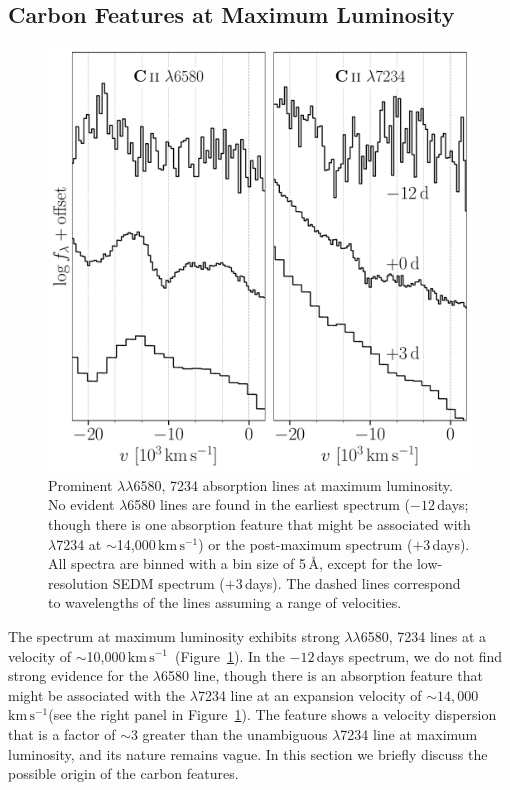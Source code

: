 \documentclass[twocolumn]{aastex631}
\newcommand{\kms}{$\mathrm{km}\,\mathrm{s}^{-1}$}
\begin{document}
\begin{CJK*}{UTF8}{gbsn}
\subsection{Carbon Features at Maximum Luminosity}\label{sec:disc_C_II}
\begin{figure}
    \centering
    \includegraphics[width=\linewidth]{C_II.pdf}
    \caption{Prominent  $\lambda\lambda$6580, 7234 absorption lines at maximum luminosity. No evident  $\lambda$6580 lines are found in the earliest spectrum ($-12$\,days; though there is one absorption feature that might be associated with  $\lambda$7234 at $\sim$14,000\,\kms) or the post-maximum spectrum ($+3$\,days). All spectra are binned with a bin size of 5\,\AA, except for the low-resolution SEDM spectrum ($+3$\,days). The dashed lines correspond to wavelengths of the  lines assuming a range of velocities.}
    \label{fig:C_II}
\end{figure}
The spectrum at maximum luminosity exhibits strong  $\lambda\lambda$6580, 7234 lines at a velocity of $\sim$10,000\,\kms\  (Figure~\ref{fig:C_II}). In the $-12$\,days spectrum, we do not find strong evidence for the  $\lambda$6580 line, though there is an absorption feature that might be associated with the  $\lambda$7234 line at an expansion velocity of $\sim$$14,000$\,\kms (see the right panel in Figure~\ref{fig:C_II}). The feature shows a velocity dispersion that is a factor of $\sim$3 greater than the unambiguous  $\lambda$7234 line at maximum luminosity, and its nature remains vague. In this section we briefly discuss the possible origin of the carbon features.


\end{CJK*}
\end{document}
